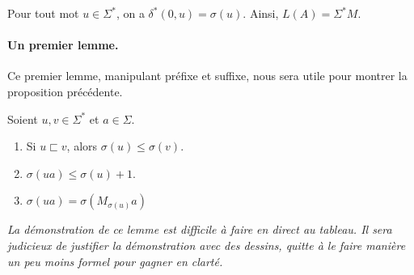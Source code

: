 \begin{proposition}\label{prop1Motif}
Pour tout mot $u\in \Sigma^*$, on a $\delta^*(0,u) =\sigma(u)$. Ainsi, $L(A)=\Sigma^*M$.
\end{proposition}

\paragraph{Un premier lemme.} Ce premier lemme, manipulant préfixe et suffixe, nous sera utile pour montrer la proposition précédente.



\begin{lemma}
Soient $u,v \in \Sigma^*$ et $a\in \Sigma$.
\begin{enumerate}
\item Si $u\sqsubset v$, alors $\sigma(u) \leq \sigma(v)$.
\item $\sigma(ua) \leq \sigma(u)+1$.
\item $\sigma(ua) =\sigma(M_{\sigma(u)}a)$
\end{enumerate}
\end{lemma}

\textit{La démonstration de ce lemme est difficile à faire en direct au tableau. Il sera judicieux de justifier la démonstration avec des dessins, quitte à le faire manière un peu moins formel pour gagner en clarté.}

